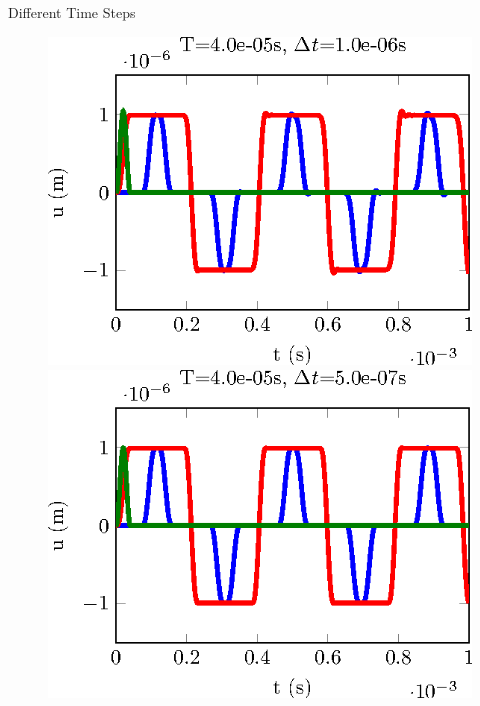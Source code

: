 \documentclass[10pt,a4paper]{beamer}
\begin{document}
\begin{frame}{Different Time Steps}
\begin{figure}
	\end{figure}
	\vspace{-0.4cm}
	\begin{figure}
		\begin{minipage}{0.35\linewidth}
			\includegraphics[width=1\linewidth]{CalculSchem3.T1.dt1e-06.tikz.eps}
		\end{minipage}
		 \hspace{1cm}
		\begin{minipage}{0.35\linewidth}
			\includegraphics*[width=1\linewidth]{CalculSchem3.T1.dt5e-07.tikz.eps}
		\end{minipage}
	\end{figure}
\end{frame}
\end{document}
